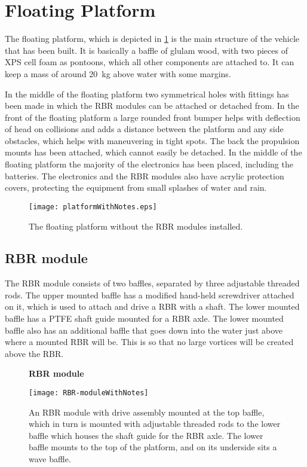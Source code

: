 \section{Floating Platform}
The floating platform, which is depicted in
\cref{fig:floatingPlatform} is the main structure of the vehicle that has been built.
It is basically a baffle of glulam wood, with two pieces of XPS cell foam as
pontoons, which all other components are attached to. It can keep a mass of
around 20~kg above water with some margins.

In the middle of the floating platform two symmetrical holes with fittings has
been made in which the RBR modules can be attached or detached from. In the
front of the floating platform a large rounded front bumper helps with
deflection of head on collisions and adds a distance between the platform and
any side obstacles, which helps with maneuvering in tight spots. The back the
propulsion mounts has been attached, which cannot easily be detached. In the
middle of the floating platform the majority of the electronics has been placed,
including the batteries. The electronics and the RBR modules also have acrylic
protection covers, protecting the equipment from small splashes of water and
rain.

\begin{figure}[h]
   \centering
   \texttt{[image: platformWithNotes.eps]}
   \caption{The floating platform without the RBR modules installed.}
   \label{fig:floatingPlatform}
\end{figure}

\subsection{RBR module}
The RBR module consists of two baffles, separated by three adjustable threaded
rods. The upper mounted baffle has a modified hand-held screwdriver attached on
it, which is used to attach and drive a RBR with a shaft. The lower mounted
baffle has a PTFE shaft guide mounted for a RBR axle. The lower mounted baffle also has an
additional baffle that goes down into the water just above where a mounted RBR
will be. This is so that no large vortices will be created above the RBR.

\begin{figure}[H]
  \centering
  \textbf{RBR module}
  \par\medskip
  \texttt{[image: RBR-moduleWithNotes]}
  \caption{An RBR module with drive assembly mounted at the top baffle,
    which in turn is mounted with adjustable threaded rods to the lower baffle
    which houses the shaft guide for the RBR axle. The lower baffle mounts to the
    top of the platform, and on its underside sits a wave baffle.}\label{fig:rbr-module}
\end{figure}

